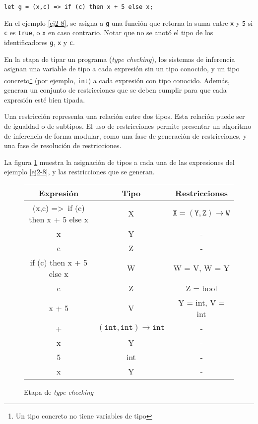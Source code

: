 \vspace{0.8em}
\begin{ej}
  \normalfont
  \label{ej2-8}
\begin{lstlisting}[morekeywords={then}]
  let g = (x,c) => if (c) then x + 5 else x;
\end{lstlisting}
\end{ej}

En el ejemplo \ref{ej2-8}, se asigna a \texttt{g} una función que retorna la suma entre \texttt{x} y \texttt{5} si \texttt{c} es \texttt{true}, o \texttt{x} en caso contrario. Notar que no se anotó el tipo de los identificadores \texttt{g}, \texttt{x} y \texttt{c}.

En la etapa de tipar un programa (\emph{type checking}), los sistemas de inferencia asignan una variable de tipo a cada expresión sin un tipo conocido, y un tipo concreto\footnote{Un tipo concreto no tiene variables de tipo} (por ejemplo, \texttt{int}) a cada expresión con tipo conocido. Además, generan un conjunto de restricciones que se deben cumplir para que cada expresión esté bien tipada.

Una restricción representa una relación entre dos tipos. Esta relación puede ser de igualdad o de subtipos. El uso de restricciones permite presentar un algoritmo de inferencia de forma modular, como una fase de generación de restricciones, y una fase de resolución de restricciones.

La figura \ref{tabla1} muestra la asignación de tipos a cada una de las expresiones del ejemplo \ref{ej2-8}, y las restricciones que se generan.


\begin{figure}[ht]
  \centering
  \ttfamily
  \begin{tabular}{c c c}
    Expresión & Tipo & Restricciones\\
    \hline
    (x,c) =>\ if (c) then x + 5 else x & X & $\mathtt{X = (Y,Z) \rightarrow W}$\\
    x & Y & -\\
    c & Z & -\\
    if (c) then x + 5 else x & W & W = V, W = Y\\
    c & Z & Z = bool\\
    x + 5 & V & Y = int, V = int\\
    + & $\mathtt{(int,int) \rightarrow int}$ & -\\
    x & Y & -\\
    5 & int & -\\
    x & Y & -\\
  \end{tabular}
  \caption{Etapa de \emph{type checking}}
  \label{tabla1}
\end{figure}

